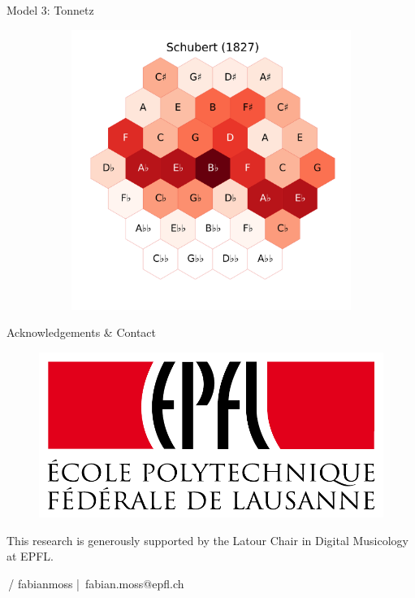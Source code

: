 \documentclass[final]{beamer}
\begin{document}
\begin{frame}[t]
\begin{minipage}[t][.6\textheight][t]{\textwidth}
\begin{columns}[t]
\begin{column}{0.3\textwidth}
\begin{block}{Model 3: Tonnetz}
\begin{figure}
\begin{subfigure}{\textwidth}
				\end{subfigure}
				\begin{subfigure}{\textwidth} %
					\includegraphics[width=\textwidth]{img/schubert_tonnetz.png}
				\end{subfigure}
			\end{figure}
      \end{block}

			\begin{block}{Acknowledgements \& Contact}

        \begin{figure}
          \includegraphics[width=.3\textwidth]{img/Logo_EPFL.pdf}
        \end{figure}

        \small
        This research is generously supported by the Latour Chair in Digital Musicology at EPFL.
				\normalsize
				\begin{center}
					\,/\,\,fabianmoss \;|\; \,fabian.moss@epfl.ch
				\end{center}
      \end{block}


\end{column}
\end{columns}
\end{minipage}
\end{frame}
\end{document}
